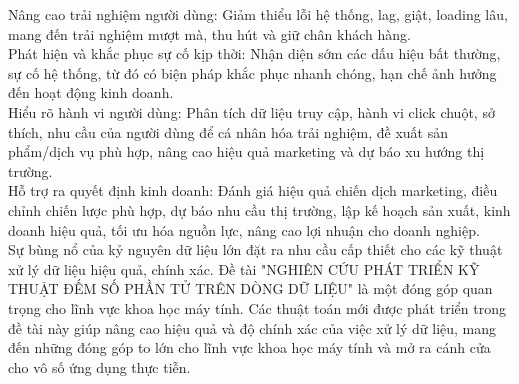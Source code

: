 \documentclass[letterpaper,13pt]{article}
\theoremstyle{mytheor}
\begin{document}
Nâng cao trải nghiệm người dùng: Giảm thiểu lỗi hệ thống, lag, giật, loading lâu, mang đến trải nghiệm mượt mà, thu hút và giữ chân khách hàng.\\

Phát hiện và khắc phục sự cố kịp thời: Nhận diện sớm các dấu hiệu bất thường, sự cố hệ thống, từ đó có biện pháp khắc phục nhanh chóng, hạn chế ảnh hưởng đến hoạt động kinh doanh.\\

Hiểu rõ hành vi người dùng: Phân tích dữ liệu truy cập, hành vi click chuột, sở thích, nhu cầu của người dùng để cá nhân hóa trải nghiệm, đề xuất sản phẩm/dịch vụ phù hợp, 
nâng cao hiệu quả marketing và dự báo xu hướng thị trường.\\

Hỗ trợ ra quyết định kinh doanh: Đánh giá hiệu quả chiến dịch marketing, điều chỉnh chiến lược phù hợp, dự báo nhu cầu thị trường, 
lập kế hoạch sản xuất, kinh doanh hiệu quả, tối ưu hóa nguồn lực, nâng cao lợi nhuận cho doanh nghiệp.\\

Sự bùng nổ của kỷ nguyên dữ liệu lớn đặt ra nhu cầu cấp thiết cho các kỹ thuật xử lý dữ liệu hiệu quả, chính xác. 
Đề tài "NGHIÊN CỨU PHÁT TRIỂN KỸ THUẬT ĐẾM SỐ PHẦN TỬ TRÊN DÒNG DỮ LIỆU" là một đóng góp quan trọng cho lĩnh vực khoa học máy tính. 
Các thuật toán mới được phát triển trong đề tài này giúp nâng cao hiệu quả và độ chính xác của việc xử lý dữ liệu, mang đến những đóng góp 
to lớn cho lĩnh vực khoa học máy tính và mở ra cánh cửa cho vô số ứng dụng thực tiễn.\\
\newpage
\printbibliography
\end{document}
